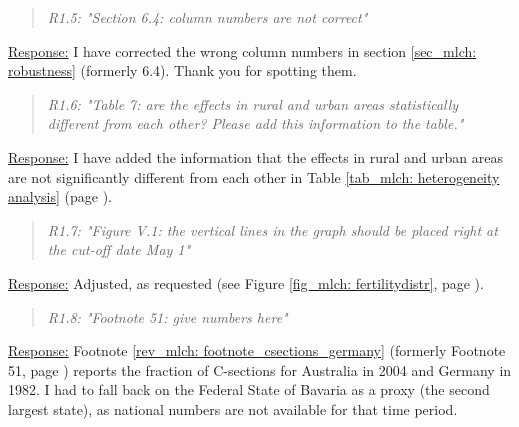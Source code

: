 \bigskip\bigskip
{}
\begin{quote}
	\textit{R1.5: "Section 6.4: column numbers are not correct"}
\end{quote}
\underline{Response:} I have corrected the wrong column numbers in section \ref{sec_mlch: robustness} (formerly 6.4). Thank you for spotting them.

\bigskip\bigskip
{}
\begin{quote}
	\textit{R1.6: "Table 7: are the effects in rural and urban areas statistically different from each other? Please add this information to the table."}
\end{quote}
\underline{Response:} I have added the information that the effects in rural and urban areas are not significantly different from each other in Table \ref{tab_mlch: heterogeneity analysis} (page \pageref{tab_mlch: heterogeneity analysis}).

\bigskip\bigskip
{}
\begin{quote}
	\textit{R1.7: "Figure V.1: the vertical lines in the graph should be placed right at the cut-off date May 1"}
\end{quote}
\underline{Response:} Adjusted, as requested (see Figure \ref{fig_mlch: fertilitydistr}, page \pageref{fig_mlch: fertilitydistr}).

\bigskip\bigskip
{}
\begin{quote}
	\textit{R1.8: "Footnote 51: give numbers here"}
\end{quote}
\underline{Response:} Footnote \ref{rev_mlch: footnote_csections_germany} (formerly Footnote 51, page \pageref{rev_mlch: footnote_csections_germany}) reports the fraction of C-sections for Australia in 2004 and Germany in 1982. I had to fall back on the Federal State of Bavaria as a proxy (the second largest state), as national numbers are not available for that time period.











